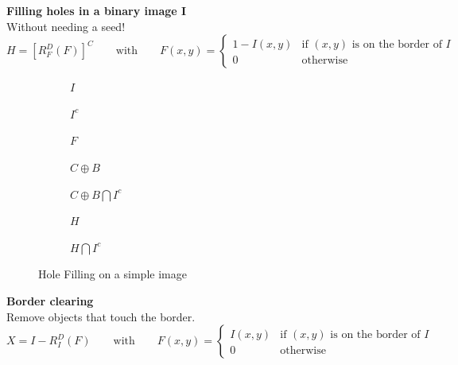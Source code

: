 \textbf{Filling holes in a binary image I}\\
Without needing a seed!\\
\[
	H = [R_F^D(F)]^C  \qquad  \text{with} \qquad F(x,y)=\begin{cases} 1-I(x,y) & \text{if $(x,y)$ is on the border of $I$}\\
  0 & \text{otherwise} \end{cases}
\]
\begin{figure}[h!]
\centering
\begin{subfigure}[b]{0.13\textwidth}
\centering
{}
\caption{$I$}
\end{subfigure}
\begin{subfigure}[b]{0.13\textwidth}
\centering
{}
\caption{$I^c$}
\end{subfigure}
\begin{subfigure}[b]{0.13\textwidth}
\centering
{}
\caption{$F$}
\end{subfigure}
\begin{subfigure}[b]{0.13\textwidth}
\centering
{}
\caption{$C \oplus B$}
\end{subfigure}
\begin{subfigure}[b]{0.13\textwidth}
\centering
{}
\caption{$C \oplus B \bigcap I^c$}
\end{subfigure}
\begin{subfigure}[b]{0.13\textwidth}
\centering
{}
\caption{$H$}
\end{subfigure}
\begin{subfigure}[b]{0.13\textwidth}
\centering
{}
\caption{$H \bigcap I^c$}
\end{subfigure}
\caption{Hole Filling on a simple image}
\end{figure}

\textbf{Border clearing}\\
Remove objects that touch the border.
\[
X = I-R_I^D(F)  \qquad  \text{with} \qquad F(x,y)=\begin{cases} I(x,y) & \text{if $(x,y)$ is on the border of $I$}\\
0 & \text{otherwise} \end{cases}
\]

